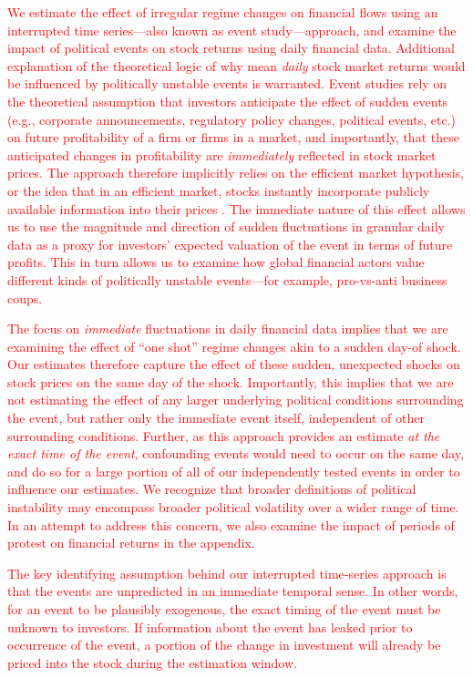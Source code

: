 \documentclass[12pt,final,fleqn]{article}
\theoremstyle{plain}
\begin{document}
\textcolor{red}{We estimate the effect of irregular regime changes on financial flows using an interrupted time series---also known as event study---approach, and examine the impact of political events on stock returns using daily financial data. Additional explanation of the theoretical logic of why mean \textit{daily} stock market returns would be influenced by politically unstable events is warranted. Event studies rely on the theoretical assumption that investors anticipate the effect of sudden events (e.g., corporate announcements, regulatory policy changes, political events, etc.) on future profitability of a firm or firms in a market, and importantly, that these anticipated changes in profitability are \textit{immediately} reflected in stock market prices. The approach therefore implicitly relies on the efficient market hypothesis, or the idea that in an efficient market, stocks instantly incorporate publicly available information into their prices \citep{fama1965behavior, samuelson1965proof}. The immediate nature of this effect allows us to use the magnitude and direction of sudden fluctuations in granular daily data as a proxy for investors' expected valuation of the event in terms of future profits. This in turn allows us to examine how global financial actors value different kinds of politically unstable events---for example, pro-vs-anti business coups.}

\textcolor{red}{The focus on \textit{immediate} fluctuations in daily financial data implies that we are examining the effect of ``one shot'' regime changes akin to a sudden day-of shock. Our estimates therefore capture the effect of these sudden, unexpected shocks on stock prices on the same day of the shock. Importantly, this implies that we are not estimating the effect of any larger underlying political conditions surrounding the event, but rather only the immediate event itself, independent of other surrounding conditions. Further, as this approach provides an estimate \textit{at the exact time of the event}, confounding events would need to occur on the same day, and do so for a large portion of all of our independently tested events in order to influence our estimates. We recognize that broader definitions of political instability may encompass broader political volatility over a wider range of time. In an attempt to address this concern, we also examine the impact of periods of protest on financial returns in the appendix.}

\textcolor{red}{The key identifying assumption behind our interrupted time-series approach is that the events are unpredicted in an immediate temporal sense. In other words, for an event to be plausibly exogenous, the exact timing of the event must be unknown to investors. If information about the event has leaked prior to occurrence of the event, a portion of the change in investment will already be priced into the stock during the estimation window.}
\end{document}
